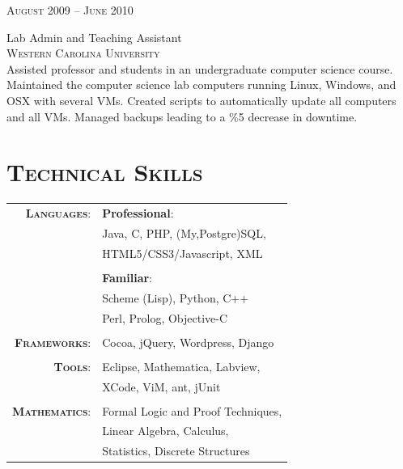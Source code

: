 \documentclass[10pt]{article}
\begin{document}
\begin{minipage}[t]{0.5\textwidth}
   \raggedleft
   \textsc{\normalsize August 2009 -- June 2010}\par
   \raggedright\large Lab Admin and Teaching Assistant\\ 
   \textsc{Western Carolina University}\\
   \normalsize{Assisted professor and students in an undergraduate 
   computer science course. Maintained the computer science lab 
   computers running Linux, Windows, and OSX with several VMs.
   Created scripts to automatically update all computers and all VMs.
   Managed backups leading to a \%5 decrease in downtime.}\\[5pt]

\section{\textsc{Technical Skills}}
   \begin{tabular}{rl}
      \textbf{\textsc{Languages}}:
                        & \textbf{Professional}:\\
                        & Java, C, PHP, (My,Postgre)SQL, \\
                        & HTML5/CSS3/Javascript, XML\\
                        & \\
                        & \textbf{Familiar}:\\
                        & Scheme (Lisp), Python, C++\\
                        & Perl, Prolog, Objective-C\\
                        & \\
      \textbf{\textsc{Frameworks}}:
                        & Cocoa, jQuery, Wordpress, Django\\
                        & \\
      \textbf{\textsc{Tools}}:
                        & Eclipse, Mathematica, Labview,\\
                        & XCode, ViM, ant, jUnit\\
                        & \\
      \textbf{\textsc{Mathematics}}:
                        & Formal Logic and Proof Techniques,\\
                        & Linear Algebra, Calculus,\\
                        & Statistics, Discrete Structures\\
\end{tabular}
\end{minipage}
\end{document}
